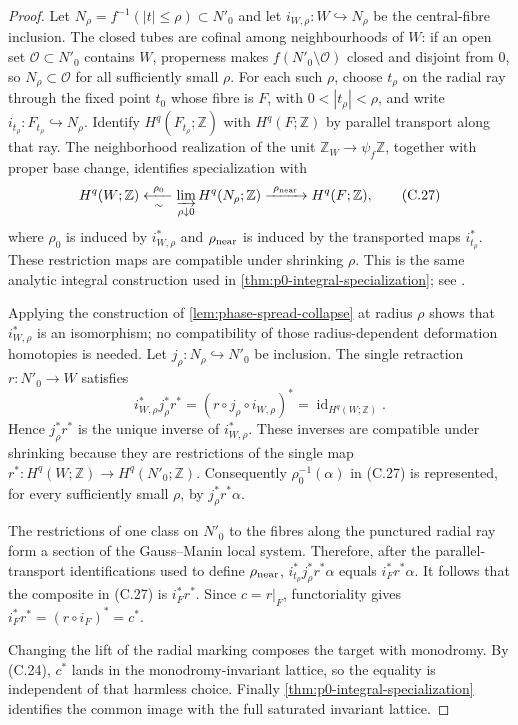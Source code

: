 \begin{proof}
Let $N_\rho=f^{-1}(|t|\leq\rho)\subset N'_0$ and let
$i_{W,\rho}:W\hookrightarrow N_\rho$ be the central-fibre inclusion.  The
closed tubes are cofinal among neighbourhoods of $W$: if an open set
$\mathcal O\subset N'_0$ contains $W$, properness makes
$f(N'_0\setminus\mathcal O)$ closed and disjoint from $0$, so
$N_\rho\subset\mathcal O$ for all sufficiently small $\rho$.  For each such
$\rho$, choose $t_\rho$ on the radial ray through the fixed point $t_0$ whose
fibre is $F$, with $0<|t_\rho|<\rho$, and write
$i_{t_\rho}:F_{t_\rho}\hookrightarrow N_\rho$.  Identify
$H^q(F_{t_\rho};\mathbb Z)$ with $H^q(F;\mathbb Z)$ by parallel transport
along that ray.  The neighborhood realization of the unit
$\mathbb Z_W\to\psi_f\mathbb Z$, together with proper base change, identifies
specialization with
\[
 H^q(W;\mathbb Z)
 \xleftarrow[\sim]{\ \rho_0\ }
 \varinjlim_{\rho\downarrow0}H^q(N_\rho;\mathbb Z)
 \xrightarrow{\ \rho_{\rm near}\ }H^q(F;\mathbb Z),
\tag{C.27}
\]
where $\rho_0$ is induced by $i_{W,\rho}^*$ and $\rho_{\rm near}$ is induced
by the transported maps $i_{t_\rho}^*$.  These restriction maps are compatible
under shrinking $\rho$.  This is the same analytic integral
construction used in
\cref{thm:p0-integral-specialization}; see
\cite[Definition~4.2.1 and Propositions~4.2.2, 4.2.11]{Dimca2004}.

Applying the construction of \cref{lem:phase-spread-collapse} at radius
$\rho$ shows that $i_{W,\rho}^*$ is an isomorphism; no compatibility of those
radius-dependent deformation homotopies is needed.  Let
$j_\rho:N_\rho\hookrightarrow N'_0$ be inclusion.  The single retraction
$r:N'_0\to W$ satisfies
\[
 i_{W,\rho}^*j_\rho^*r^*
 =(r\circ j_\rho\circ i_{W,\rho})^*
 =\operatorname{id}_{H^q(W;\mathbb Z)}.
\]
Hence $j_\rho^*r^*$ is the unique inverse of $i_{W,\rho}^*$.  These inverses
are compatible under shrinking because they are restrictions of the single
map $r^*:H^q(W;\mathbb Z)\to H^q(N'_0;\mathbb Z)$.  Consequently
$\rho_0^{-1}(\alpha)$ in (C.27) is represented, for every sufficiently small
$\rho$, by $j_\rho^*r^*\alpha$.

The restrictions of one class on $N'_0$ to the fibres along the punctured
radial ray form a section of the Gauss--Manin local system.  Therefore, after
the parallel-transport identifications used to define $\rho_{\rm near}$,
$i_{t_\rho}^*j_\rho^*r^*\alpha$ equals $i_F^*r^*\alpha$.  It follows that the
composite in
(C.27) is $i_F^*r^*$.  Since $c=r|_F$, functoriality gives
$i_F^*r^*=(r\circ i_F)^*=c^*$.

Changing the lift of the radial marking composes the target with monodromy.
By (C.24), $c^*$ lands in the monodromy-invariant lattice, so the equality is
independent of that harmless choice.  Finally
\cref{thm:p0-integral-specialization} identifies the common image with the
full saturated invariant lattice.
\end{proof}

